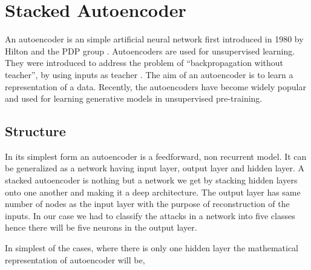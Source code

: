 \documentclass[12pt, a4paper]{report}
\begin{document}
\section{Stacked Autoencoder}\label{Autoencoder}
An autoencoder is an simple artificial neural network first introduced in 1980 by Hilton and the PDP group \cite{autoencoder}. Autoencoders are used for unsupervised learning. They were introduced to address the problem of ``backpropagation without teacher'', by using inputs as teacher \cite{autoencoder2}. The aim of an autoencoder is to learn a representation of a data. Recently, the autoencoders have become widely popular and used for learning generative models in unsupervised pre-training.\\ 
\par

\subsection{Structure}\label{structure}

In its simplest form an autoencoder is a feedforward, non recurrent model. It can be generalized as a network having input layer, output layer and hidden layer. A stacked autoencoder is nothing but a network we get by stacking hidden layers onto one another and making it a deep architecture. The output layer has same number of nodes as the input layer with the purpose of reconstruction of the inputs. In our case we had to classify the attacks in a network into five classes hence there will be five neurons in the output layer.\\ \par

In simplest of the cases, where there is only one hidden layer the mathematical representation of autoencoder will be,
\end{document}
